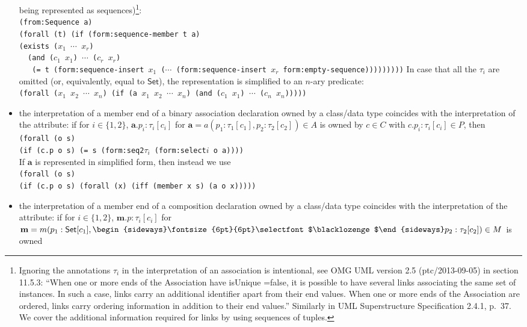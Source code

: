 \documentclass[10pt,fleqn,%
\ifpretendfinal
final%
\else
draft%
\fi,
]{scrreprt}
\newcommand{\composition}{\raisebox{0.2pt}{\begin{sideways}\fontsize{6pt}{6pt}\selectfont$\blacklozenge$\end{sideways}}}
\newcommand{\white}[1]{{\color{white}{#1}}}
\newcommand{\qqquad}{\white{x}\qquad}
\begin{document}
\begin{itemize}
being represented as sequences)\footnote{Ignoring the annotations $\tau_i$ in the interpretation of an association is intentional, see OMG UML version 2.5 (ptc/2013-09-05) in section 11.5.3: ``When one or more ends of the Association have isUnique =false, it is possible to have several links associating the same set of
instances. In such a case, links carry an additional identifier apart from their end values.
When one or more ends of the Association are ordered, links carry ordering information in addition to their end values.'' Similarly in UML Superstructure Specification 2.4.1, p.~37. We cover the additional information required for links by using sequences of tuples.}:\\
\texttt{(from:Sequence a)}\\
\texttt{(forall (t) (if (form:sequence-member t a)\\
\qqquad\qqquad  (exists ($x_1$ $\cdots$ $x_r$)\\
\qqquad\qqquad\qqquad\ \  (and ($c_1$ $x_1$) $\cdots$ ($c_r$ $x_r$)\\
\ \ \  (= t (form:sequence-insert $x_1$ ($\cdots$ (form:sequence-insert $x_r$ form:empty-sequence)))))))))}
In case that all the $\tau_i$ are omitted (or, equivalently, equal to 
$\mathsf{Set}$), the representation is simplified to an $n$-ary predicate:\\
\texttt{(forall ($x_1$ $x_2$ $\cdots$  $x_n$) (if (a $x_1$ $x_2$ $\cdots$  $x_n$) (and ($c_1$ $x_1$) $\cdots$ ($c_n$ $x_n$)))))}
\item the interpretation of a member end of a binary association
declaration owned by a class/data type coincides with the interpretation
of the attribute: if for $i\in\{1,2\}$, $\mathbf{a}.p_i : \tau_i[c_i]$ for
$\mathbf{a} = a(p_1 : \tau_1[c_1], p_2 : \tau_2[c_2]) \in A$ is owned by
$c \in C$ with $c.p_i : \tau_i[c_i] \in P$, then\\
\texttt{(forall (o s)\\
\qqquad (if (c.p o s) (= s (form:seq2$\tau_i$ (form:select$i$ o a))))}\\
If $\mathbf{a}$ is represented in simplified form, then instead we use\\
\texttt{(forall (o s)\\
\qqquad (if (c.p o s) (forall (x) (iff (member x s) (a o x)))))}
\item the interpretation of a member end of a composition declaration
owned by a class/data type coincides with the interpretation of the
attribute: if for $i\in\{1,2\}$, $\mathbf{m}.p : \tau_i[c_i]$ for $\mathbf{m}=m(p_1 : \mathsf{Set}[c_1], \composition p_2 : \tau_2[c_2]) \in M$ is owned

\end{itemize}
\end{document}
